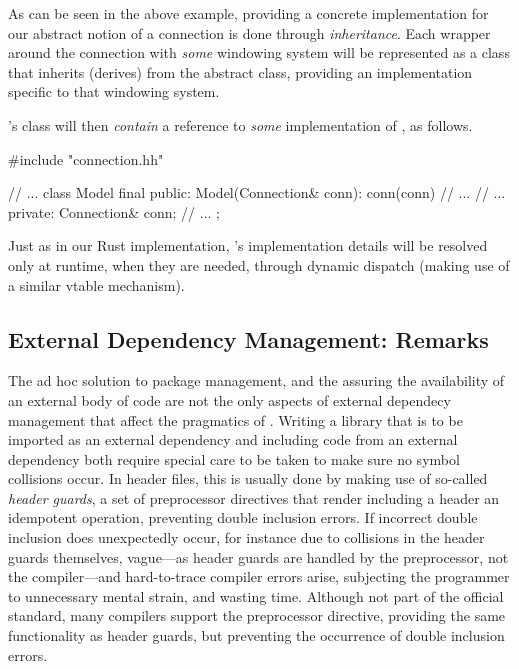 As can be seen in the above example, providing a concrete implementation for
our abstract notion of a connection is done through \textit{inheritance}.
Each wrapper around the connection with \textit{some} windowing system will
be represented as a class that inherits (derives) from the 
abstract class, providing an implementation specific to that windowing system.

\wmcpp's  class will then \textit{contain} a reference to
\textit{some} implementation of , as follows.

\begin{cppblock}
  #include "connection.hh"
\end{cppblock}
\begin{cppblock}
  // ...
  class Model final
  {
  public:
    Model(Connection& conn): conn(conn) {
      // ...
    }
    // ...
  private:
    Connection& conn;
    // ...
  };
\end{cppblock}

Just as in our Rust implementation, 's implementation details will
be resolved only at runtime, when they are needed, through dynamic dispatch
(making use of a similar vtable mechanism).


\subsection{External Dependency Management: Remarks}

The ad hoc solution to \cpp package management, and the assuring the
availability of an external body of code are not the only aspects of external
dependecy management that affect the pragmatics of \cpp. Writing a library
that is to be imported as an external dependency and including code from an
external dependency both require special care to be taken to make sure no
symbol collisions occur. In header files, this is usually done by making use
of so-called \textit{header guards}, a set of preprocessor directives that
render including a header an idempotent operation, preventing double inclusion
errors. If incorrect double inclusion does unexpectedly occur, for instance
due to collisions in the header guards themselves, vague---as header guards
are handled by the preprocessor, not the compiler---and hard-to-trace compiler
errors arise, subjecting the programmer to unnecessary mental strain, and
wasting time. Although not part of the official standard\cite{cppstd}, many \cpp
compilers support the  preprocessor directive, providing the
same functionality as header guards, but preventing the occurrence of double
inclusion errors.

